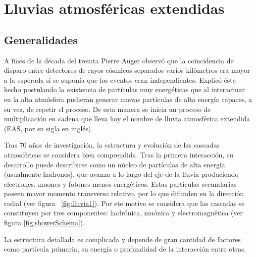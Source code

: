 \chapter{Lluvias atmosf\'ericas extendidas}
\label{ch:easAuger}

\section{Generalidades}

A fines de la década del treinta Pierre Auger observó que la coincidencia de disparo entre detectores de rayos c\'osmicos separados varios kilómetros era mayor a la esperada si se supon\'ia que los eventos eran independientes.
Explicó éste hecho postulando la existencia de partículas muy energéticas que al interactuar en la alta atmósfera pudieran generar nuevas partículas de alta energía capaces, a su vez, de repetir el proceso. De esta manera se inicia un proceso de multiplicación en cadena que lleva hoy el nombre de lluvia atmosférica extendida (EAS, por su sigla en inglés). 

Tras 70 años de investigación, la estructura y evolución de las cascadas atmosféricas se considera bien comprendida.
Tras la primera interacción, su desarrollo puede describirse como un núcleo de partículas de alta energía (usualmente hadrones), que avanza a lo largo del eje de la lluvia produciendo electrones, muones y fotones menos energéticos.
Estas part\'iculas secundarias poseen mayor momento transverso relativo, por lo que difunden en la dirección radial (ver figura ~\ref{fig:lluvia1}).
Por ete motivo se considera que las cascadas se constituyen por tres componentes: hadrónica, muónica y electromagnética (ver figura \ref{fig:showerSchema}).

La estructura detallada es complicada y depende de gran cantidad de factores como partícula primaria, su energ\'ia o profundidad de la interacción entre otras.

